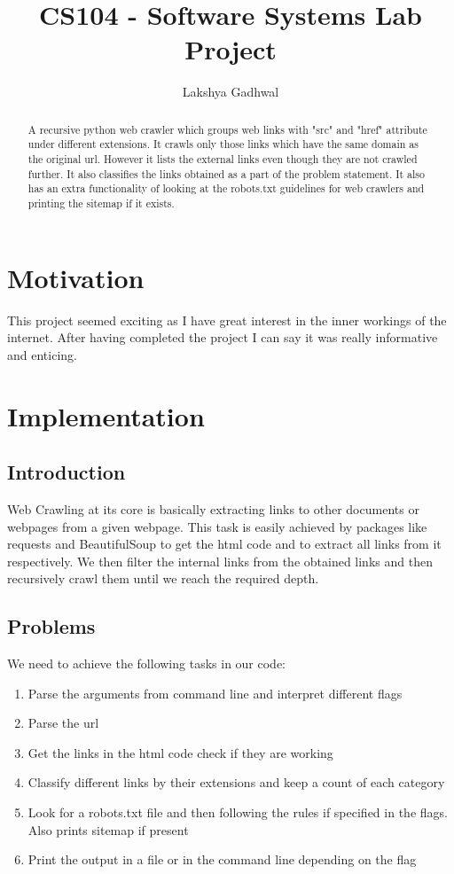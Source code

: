 \documentclass{article}
\title{CS104 - Software Systems Lab Project}
\author{Lakshya Gadhwal}
\begin{document}
\maketitle

\begin{abstract}
A recursive python web crawler which groups web links with "src" and "href" attribute under different extensions. It crawls only those links which have the same domain as the original url. However it lists the external links even though they are not crawled further. It also classifies the links obtained as a part of the problem statement. It also has an extra functionality of looking at the robots.txt guidelines for web crawlers and printing the sitemap if it exists.
\end{abstract}

\section{Motivation}

This project seemed exciting as I have great interest in the inner workings of the internet. After having completed the project I can say it was really informative and enticing.

\section{Implementation}


\subsection{Introduction}
Web Crawling at its core is basically extracting links to other documents or webpages from a given webpage. This task is easily achieved by packages like requests and BeautifulSoup to get the html code and to extract all links from it respectively. We then filter the internal links from the obtained links and then recursively crawl them until we reach the required depth.

\subsection{Problems}

We need to achieve the following tasks in our code:
\begin{enumerate}
    \item Parse the arguments from command line and interpret different flags
    \item Parse the url
    \item Get the links in the html code check if they are working
    \item Classify different links by their extensions and keep a count of each category
    \item Look for a robots.txt file and then following the rules if specified in the flags. Also prints sitemap if present
    \item Print the output in a file or in the command line depending on the flag
\end{enumerate}
\newline
\end{document}
